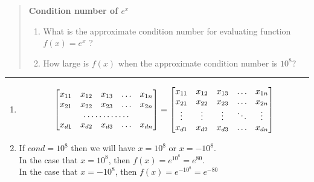 \documentclass[11pt]{article}
\begin{document}



\begin{quote}
{\Large \textbf{Condition number of $e^x$}}\\

\begin{enumerate}[1.]
    \item
    What is the approximate condition number for evaluating function $f(x) = e^x$ ?
    \item
    How large is $f(x)$ when the approximate condition number is $10^8$?
\end{enumerate}
\end{quote}
\hrule

\begin{solution}
    
\begin{enumerate}[1.]
    \item 
    \[
        \begin{bmatrix}
            x_{11}       & x_{12} & x_{13} & \dots & x_{1n} \\
            x_{21}       & x_{22} & x_{23} & \dots & x_{2n} \\
            \hdotsfor{5} \\
            x_{d1}       & x_{d2} & x_{d3} & \dots & x_{dn}
        \end{bmatrix}
        =
        \begin{bmatrix}
            x_{11} & x_{12} & x_{13} & \dots  & x_{1n} \\
            x_{21} & x_{22} & x_{23} & \dots  & x_{2n} \\
            \vdots & \vdots & \vdots & \ddots & \vdots \\
            x_{d1} & x_{d2} & x_{d3} & \dots  & x_{dn}
        \end{bmatrix}
    \]
    \item
        If $cond = 10^8$ then we will have $x = 10^8$ or $x = -10^8$.\\
        In the case that $x = 10^8$, then $f(x) = e^{10^8} = e ^ {80}$.\\
        In the case that $x = -10^8$, then $f(x) = e^{-10^8} = e ^ {-80}$
\end{enumerate}

\end{solution}
\end{document}
